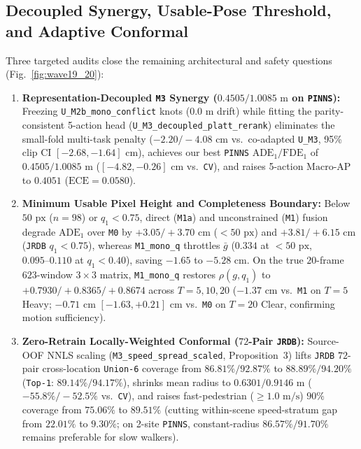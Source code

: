 \documentclass[journal]{IEEEtran}
\begin{document}
\subsection{Decoupled Synergy, Usable-Pose Threshold, and Adaptive Conformal}
Three targeted audits close the remaining architectural and safety questions (Fig.~\ref{fig:wave19_20}):
\begin{enumerate}
  \item \textbf{Representation-Decoupled \texttt{M3} Synergy ($0.4505 / 1.0085\text{ m}$ on \texttt{PINNS}):} Freezing \texttt{U\_M2b\_mono\_conflict} knots ($0.0\text{ m}$ drift) while fitting the parity-consistent 5-action head (\texttt{U\_M3\_decoupled\_platt\_rerank}) eliminates the small-fold multi-task penalty ($-2.20 / -4.08\text{ cm}$ vs.\ co-adapted \texttt{U\_M3}, 95\% clip CI $[-2.68, -1.64]\text{ cm}$), achieves our best \texttt{PINNS} $\text{ADE}_1 / \text{FDE}_1$ of $0.4505 / 1.0085\text{ m}$ ($[-4.82, -0.26]\text{ cm}$ vs.\ \texttt{CV}), and raises 5-action $\text{Macro-AP}$ to $0.4051$ ($\text{ECE} = 0.0580$).
  \item \textbf{Minimum Usable Pixel Height and Completeness Boundary:} Below $50\text{ px}$ ($n = 98$) or $q_1 < 0.75$, direct (\texttt{M1a}) and unconstrained (\texttt{M1}) fusion degrade $\text{ADE}_1$ over \texttt{M0} by $+3.05 / +3.70\text{ cm}$ ($<50\text{ px}$) and $+3.81 / +6.15\text{ cm}$ (\texttt{JRDB} $q_1 < 0.75$), whereas \texttt{M1\_mono\_q} throttles $\bar{g}$ ($0.334$ at $<50\text{ px}$, $0.095\text{--}0.110$ at $q_1 < 0.40$), saving $-1.65$ to $-5.28\text{ cm}$. On the true $20$-frame $623$-window $3\times 3$ matrix, \texttt{M1\_mono\_q} restores $\rho(g, q_1)$ to $+0.7930 / +0.8365 / +0.8674$ across $T = 5, 10, 20$ ($-1.37\text{ cm}$ vs.\ \texttt{M1} on $T=5$ Heavy; $-0.71\text{ cm}$ $[-1.63, +0.21]\text{ cm}$ vs.\ \texttt{M0} on $T=20$ Clear, confirming motion sufficiency).
  \item \textbf{Zero-Retrain Locally-Weighted Conformal ($72$-Pair \texttt{JRDB}):} Source-OOF NNLS scaling (\texttt{M3\_speed\_spread\_scaled}, Proposition~3) lifts \texttt{JRDB} $72$-pair cross-location \texttt{Union-6} coverage from $86.81\% / 92.87\%$ to $88.89\% / 94.20\%$ (\texttt{Top-1}: $89.14\% / 94.17\%$), shrinks mean radius to $0.6301 / 0.9146\text{ m}$ ($-55.8\% / -52.5\%$ vs.\ \texttt{CV}), and raises fast-pedestrian ($\ge 1.0\text{ m/s}$) $90\%$ coverage from $75.06\%$ to $89.51\%$ (cutting within-scene speed-stratum gap from $22.01\%$ to $9.30\%$; on 2-site \texttt{PINNS}, constant-radius $86.57\% / 91.70\%$ remains preferable for slow walkers).
\end{enumerate}
\end{document}
